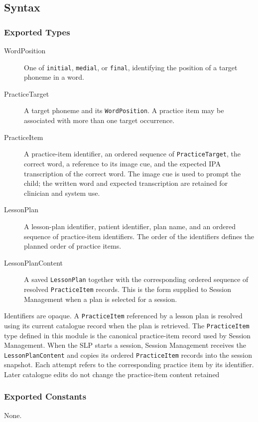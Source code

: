 \documentclass[12pt, titlepage]{article}
\begin{document}
\subsection{Syntax}

\subsubsection{Exported Types}
\begin{description}
\item[WordPosition] One of \texttt{initial}, \texttt{medial}, or
\texttt{final}, identifying the position of a target phoneme in a word.
\item[PracticeTarget] A target phoneme and its \texttt{WordPosition}. A
practice item may be associated with more than one target occurrence.
\item[PracticeItem] A practice-item identifier, an ordered sequence of
\texttt{PracticeTarget}, the correct word, a reference to its image cue, and
the expected IPA transcription of the correct word. The image cue is used
to prompt the child; the written word and expected transcription are retained
for clinician and system use.
\item[LessonPlan] A lesson-plan identifier, patient identifier, plan name,
and an ordered sequence of practice-item identifiers. The order of the
identifiers defines the planned order of practice items.
\item[LessonPlanContent] A saved \texttt{LessonPlan} together with the
corresponding ordered sequence of resolved \texttt{PracticeItem} records.
This is the form supplied to Session Management when a plan is selected for
a session.
\end{description}

Identifiers are opaque. A \texttt{PracticeItem} referenced by a lesson plan
is resolved using its current catalogue record when the plan is retrieved.
The \texttt{PracticeItem} type defined in this module is the canonical
practice-item record used by Session Management. When the SLP starts a
session, Session Management receives the \texttt{LessonPlanContent} and
copies its ordered \texttt{PracticeItem} records into the session snapshot.
Each attempt refers to the corresponding practice item by its identifier.
Later catalogue edits do not change the practice-item content retained

\subsubsection{Exported Constants}
None.
\end{document}
